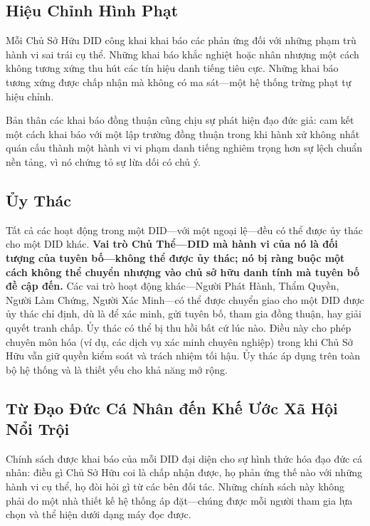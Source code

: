 \documentclass[11pt,a4paper,twocolumn]{article}
\begin{document}
\subsection{Hiệu Chỉnh Hình Phạt}

Mỗi Chủ Sở Hữu DID công khai khai báo các phản ứng đối với những phạm trù hành vi sai trái cụ thể. Những khai báo khắc nghiệt hoặc nhân nhượng một cách không tương xứng thu hút các tín hiệu danh tiếng tiêu cực. Những khai báo tương xứng được chấp nhận mà không có ma sát---một hệ thống trừng phạt tự hiệu chỉnh.

Bản thân các khai báo đồng thuận cũng chịu sự phát hiện đạo đức giả: cam kết một cách khai báo với một lập trường đồng thuận trong khi hành xử không nhất quán cấu thành một hành vi vi phạm danh tiếng nghiêm trọng hơn sự lệch chuẩn nền tảng, vì nó chứng tỏ sự lừa dối có chủ ý.

\subsection{Ủy Thác}

Tất cả các hoạt động trong một DID---với một ngoại lệ---đều có thể được ủy thác cho một DID khác. \textbf{Vai trò Chủ Thể---DID mà hành vi của nó là đối tượng của tuyên bố---không thể được ủy thác; nó bị ràng buộc một cách không thể chuyển nhượng vào chủ sở hữu danh tính mà tuyên bố đề cập đến.} Các vai trò hoạt động khác---Người Phát Hành, Thẩm Quyền, Người Làm Chứng, Người Xác Minh---có thể được chuyển giao cho một DID được ủy thác chỉ định, dù là để xác minh, gửi tuyên bố, tham gia đồng thuận, hay giải quyết tranh chấp. Ủy thác có thể bị thu hồi bất cứ lúc nào. Điều này cho phép chuyên môn hóa (ví dụ, các dịch vụ xác minh chuyên nghiệp) trong khi Chủ Sở Hữu vẫn giữ quyền kiểm soát và trách nhiệm tối hậu. Ủy thác áp dụng trên toàn bộ hệ thống và là thiết yếu cho khả năng mở rộng.

\subsection{Từ Đạo Đức Cá Nhân đến Khế Ước Xã Hội Nổi Trội}

Chính sách được khai báo của mỗi DID đại diện cho sự hình thức hóa đạo đức cá nhân: điều gì Chủ Sở Hữu coi là chấp nhận được, họ phản ứng thế nào với những hành vi cụ thể, họ đòi hỏi gì từ các bên đối tác. Những chính sách này không phải do một nhà thiết kế hệ thống áp đặt---chúng được mỗi người tham gia lựa chọn và thể hiện dưới dạng máy đọc được.
\end{document}
